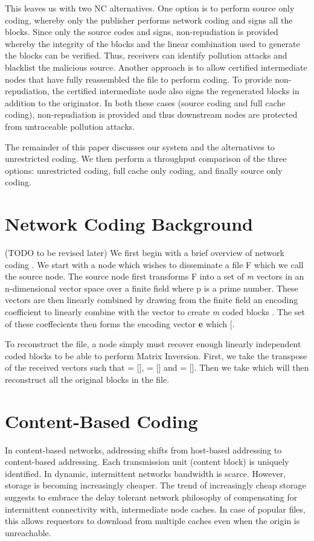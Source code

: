 This leaves us with two NC alternatives. One option is to perform source only coding, whereby only the publisher performs network coding and signs all the blocks. Since only the source codes and signs, non-repudiation is provided whereby the integrity of the blocks and the linear combination used to generate the blocks can be verified. Thus, receivers can identify pollution attacks and blacklist the malicious source. Another approach is to allow certified intermediate nodes that have fully reassembled the file to perform coding. To provide non-repudiation, the certified  intermediate node also signs the regenerated blocks in addition to the originator. In both these cases (source coding and full cache coding), non-repudiation is provided and thus downstream nodes are protected from untraceable pollution attacks.

The remainder of this paper discusses our system and the alternatives to unrestricted coding. We then perform a throughput comparison of the three options: unrestricted coding, full cache only coding, and finally source only coding.




\section{Network Coding Background} (TODO to be revised later)
We first begin with a brief overview of network coding \cite{ho2006random,fragouli2006network}. We start with a node which wishes to disseminate a file F which we call the source node. The source node first transforms F into a set of \textit{m} vectors  in an n-dimensional vector space over a finite field  where p is a prime number. These vectors are then linearly combined by drawing from the finite field  an encoding coefficient  to linearly combine with the vector to create \textit{m} coded blocks . The set of these coeffecients then forms the encoding vector \textbf{e} which [.


To reconstruct the file, a node simply must recover enough linearly independent coded blocks to be able to perform Matrix Inversion. First, we take the transpose of the received vectors such that  = [],  = [] and  = []. Then we take  which will then reconstruct all the original blocks in the file.


\section{Content-Based Coding}
In content-based networks, addressing shifts from host-based addressing to content-based addressing. Each transmission unit (content block) is uniquely identified. In dynamic, intermittent  networks bandwidth is scarce. However, storage is becoming increasingly cheaper. The trend of increasingly cheap storage suggests to embrace the delay tolerant network philosophy of compensating for intermittent connectivity with, intermediate node caches. In case of popular files, this allows requestors to download from multiple caches even when the origin is unreachable.

